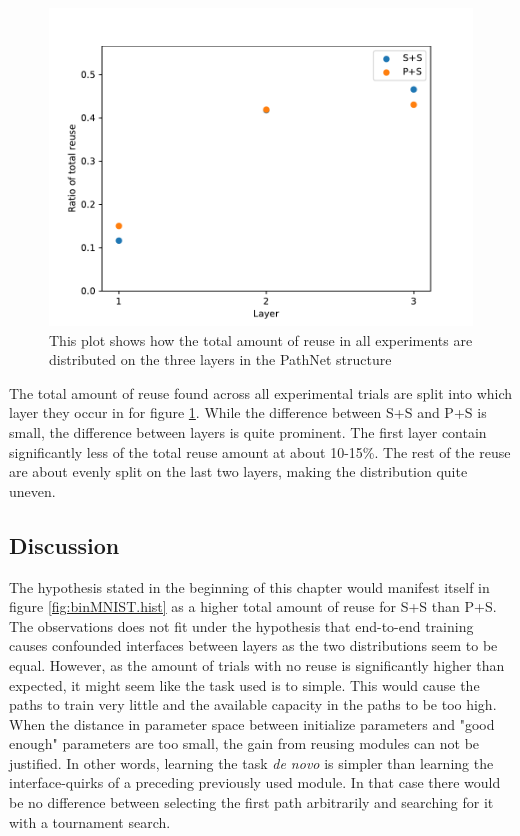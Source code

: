 \begin{figure}[t]
    \includegraphics[width=\textwidth]{Chapters/4.Experiments/exp1/figures/BIN_reuse_by_layer.pdf}
    \caption{This plot shows how the total amount of reuse in all experiments are distributed on the three layers in the PathNet structure }
    \label{fig:binMNIST.layer_reuse}
\end{figure}
 
The total amount of reuse found across all experimental trials are split into which layer they occur in for figure \ref{fig:binMNIST.layer_reuse}. While the difference between S+S and P+S is small, the difference between layers is quite prominent. The first layer contain significantly less of the total reuse amount at about 10-15\%. The rest of the reuse are about evenly split on the last two layers, making the distribution quite uneven. 

\subsection{Discussion}
\label{exp1:BIN.discussion}
The hypothesis stated in the beginning of this chapter would manifest itself in figure \ref{fig:binMNIST.hist} as a higher total amount of reuse for S+S than P+S. The observations does not fit under the hypothesis that end-to-end training causes confounded interfaces between layers as the two distributions seem to be equal. However, as the amount of trials with no reuse is significantly higher than expected, it might seem like the task used is to simple. This would cause the paths to train very little and the available capacity in the paths to be too high. When the distance in parameter space between initialize parameters and "good enough" parameters are too small, the gain from reusing modules can not be justified. In other words, learning the task \textit{de novo} is simpler than learning the interface-quirks of a preceding previously used module. In that case there would be no difference between selecting the first path arbitrarily and searching for it with a tournament search. 

